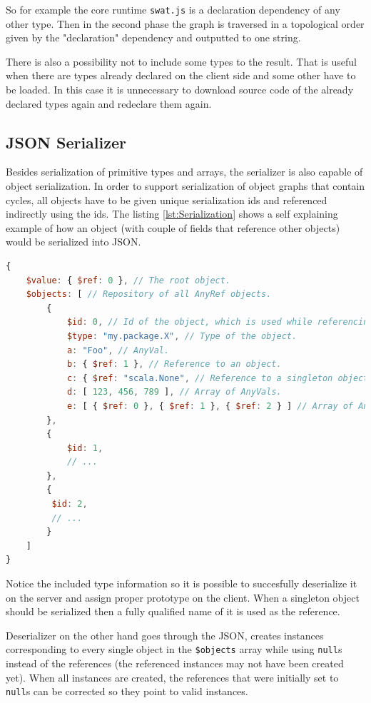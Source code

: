 \documentclass[12pt,a4paper]{report}
\begin{document}
So for example the core runtime \texttt{swat.js} is a declaration dependency of any other type. Then in the second phase the graph is traversed in a topological order given by the "declaration" dependency and outputted to one string. 

There is also a possibility not to include some types to the result. That is useful when there are types already declared on the client side and some other have to be loaded. In this case it is unnecessary to download source code of the already declared types again and redeclare them again.

\subsection{JSON Serializer}

Besides serialization of primitive types and arrays, the serializer is also capable of object serialization. In order to support serialization of object graphs that contain cycles, all objects have to be given unique serialization ids and referenced indirectly using the ids. The listing \ref{lst:Serialization} shows a self explaining example of how an object (with couple of fields that reference other objects) would be serialized into JSON. 

\begin{minipage}{\linewidth}
\begin{lstlisting}[language=JavaScript,caption={A serialized object that references other objects.},label={lst:Serialization},basicstyle=\scriptsize\ttfamily]
{
	$value: { $ref: 0 }, // The root object.
	$objects: [ // Repository of all AnyRef objects.
		{
			$id: 0, // Id of the object, which is used while referencing it.
			$type: "my.package.X", // Type of the object.
			a: "Foo", // AnyVal.
			b: { $ref: 1 }, // Reference to an object.
			c: { $ref: "scala.None", // Reference to a singleton object.
			d: [ 123, 456, 789 ], // Array of AnyVals.
			e: [ { $ref: 0 }, { $ref: 1 }, { $ref: 2 } ] // Array of AnyRefs.
		},
		{
			$id: 1,
			// ...
		},
		{
		 $id: 2,
		 // ...
		}
	]
}
\end{lstlisting}
\end{minipage}

Notice the included type information so it is possible to succesfully deserialize it on the server and assign proper prototype on the client. When a singleton object should be serialized then a fully qualified name of it is used as the reference.

Deserializer on the other hand goes through the JSON, creates instances corresponding to every single object in the \texttt{\$objects} array while using \texttt{null}s instead of the references (the referenced instances may not have been created yet). When all instances are created, the references that were initially set to \texttt{null}s can be corrected so they point to valid instances.
\end{document}
